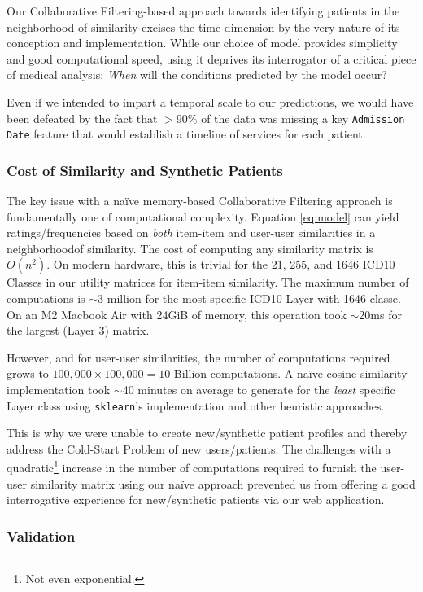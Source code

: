 \documentclass[twoside,11pt]{article}
\begin{document}
{Our Collaborative Filtering-based approach towards identifying patients in the neighborhood of similarity excises the time dimension by the very nature of its conception and implementation. While our choice of model provides simplicity and good computational speed, using it deprives its interrogator of a critical piece of medical analysis: \textit{When} will the conditions predicted by the model occur?

Even if we intended to impart a temporal scale to our predictions, we would have been defeated by the fact that $>90\%$ of the data was missing a key \texttt{Admission Date} feature that would establish a timeline of services for each patient.

\subsubsection*{Cost of Similarity and Synthetic Patients}

The key issue with a na{\"i}ve memory-based Collaborative Filtering approach is fundamentally one of computational complexity. Equation \ref{eq:model} can yield ratings/frequencies based on \textit{both} item-item and user-user similarities in a neighborhoodof similarity. The cost of computing any similarity matrix is $O(n^2)$. On modern hardware, this is trivial for the 21, 255, and 1646 ICD10 Classes in our utility matrices for item-item similarity. The maximum number of computations is $\sim$3 million for the most specific ICD10 Layer with 1646 classe. On an M2 Macbook Air with 24GiB of memory, this operation took $\sim$20ms for the largest (Layer 3) matrix.

However, and for user-user similarities, the number of computations required grows to $100,000 \times 100,000 = 10$ Billion computations. A na{\"i}ve cosine similarity implementation took $\sim$40 minutes on average to generate for the \textit{least} specific Layer class using \texttt{sklearn}'s implementation and other heuristic approaches.

This is why we were unable to create new/synthetic patient profiles and thereby address the Cold-Start Problem of new users/patients. The challenges with a quadratic\footnote{Not even exponential.} increase in the number of computations required to furnish the user-user similarity matrix using our na{\"i}ve approach prevented us from offering a good interrogative experience for new/synthetic patients via our web application.

\subsubsection*{Validation}

}
\end{document}
